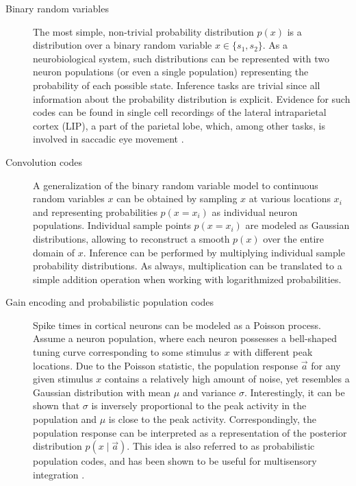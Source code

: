 \documentclass[a4paper,11pt]{article}
\begin{document}
\begin{description}
\item[Binary random variables]
The most simple, non-trivial probability distribution $p(x)$ is a distribution over a binary random variable $x \in \{s_1 , s_2\}$. As a neurobiological system, such distributions can be represented with two neuron populations (or even a single population) representing the probability of each possible state. Inference tasks are trivial since all information about the probability distribution is explicit. Evidence for such codes can be found in single cell recordings of the lateral intraparietal cortex (LIP), a part of the parietal lobe, which, among other tasks, is involved in saccadic eye movement \cite{kandel2012principles}.

\item[Convolution codes]
A generalization of the binary random variable model to continuous random variables $x$ can be obtained by sampling $x$ at various locations $x_i$ and representing probabilities $p(x = x_i)$ as individual neuron populations. Individual sample points $p(x = x_i)$ are modeled as Gaussian distributions, allowing to reconstruct a smooth $p(x)$ over the entire domain of $x$. Inference can be performed by multiplying individual sample probability distributions. As always, multiplication can be translated to a simple addition operation when working with logarithmized probabilities.

\item[Gain encoding and probabilistic population codes]
Spike times in cortical neurons can be modeled as a Poisson process. Assume a neuron population, where each neuron possesses a bell-shaped tuning curve corresponding to some stimulus $x$ with different peak locations. Due to the Poisson statistic, the population response $\vec a$ for any given stimulus $x$ contains a relatively high amount of noise, yet resembles a Gaussian distribution with mean $\mu$ and variance $\sigma$. Interestingly, it can be shown that $\sigma$ is inversely proportional to the peak activity in the population and $\mu$ is close to the peak activity. Correspondingly, the population response can be interpreted as a representation of the posterior distribution $p(x \mid \vec a)$. This idea is also referred to as probabilistic population codes, and has been shown to be useful for multisensory integration \cite{ma2006bayesian}.


\end{description}
\end{document}
